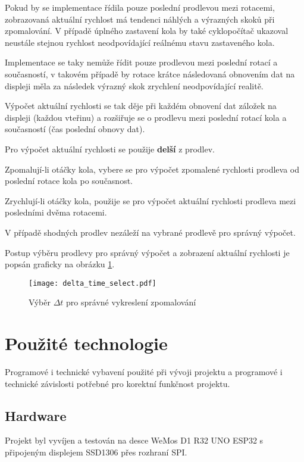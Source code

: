 \documentclass[twocolumn,a4paper,10pt]{article}
\begin{document}
Pokud by se implementace řídila pouze poslední prodlevou mezi rotacemi, zobrazovaná aktuální rychlost má tendenci náhlých a výrazných skoků při zpomalování. V případě úplného zastavení kola by také cyklopočítač ukazoval neustále stejnou rychlost neodpovídající reálnému stavu zastaveného kola.

Implementace se taky nemůže řídit pouze prodlevou mezi poslední rotací a současností, v takovém případě by rotace krátce následovaná obnovením dat na displeji měla za následek výrazný skok zrychlení neodpovídající realitě.

Výpočet aktuální rychlosti se tak děje při každém obnovení dat záložek na displeji (každou vteřinu) a rozšiřuje se o prodlevu mezi poslední rotací kola a současností (čas poslední obnovy dat).

Pro výpočet aktuální rychlosti se použije \textbf{delší} z prodlev.

Zpomalují-li otáčky kola, vybere se pro výpočet zpomalené rychlosti prodleva od poslední rotace kola po současnost.

Zrychlují-li otáčky kola, použije se pro výpočet aktuální rychlosti prodleva mezi posledními dvěma rotacemi.

V případě shodných prodlev nezáleží na vybrané prodlevě pro správný výpočet.

Postup výběru prodlevy pro správný výpočet a zobrazení aktuální rychlosti je popsán graficky na obrázku \ref{fig:t_diff}.

\begin{center}
    \begin{figure}[h]
        \centering
        \texttt{[image: delta\_time\_select.pdf]}
        \caption{Výběr $\Delta t$ pro správné vykreslení zpomalování}
        \label{fig:t_diff}
    \end{figure}
\end{center}

\section{Použité technologie}\label{sec:technologies}
Programové i technické vybavení použité při vývoji projektu a programové i technické závislosti potřebné pro korektní funkčnost projektu.

\subsection{Hardware}\label{sec:dependencies_hw}
Projekt byl vyvíjen a testován na desce WeMos D1 R32 UNO ESP32 s připojeným displejem SSD1306 přes rozhraní SPI.
\end{document}
